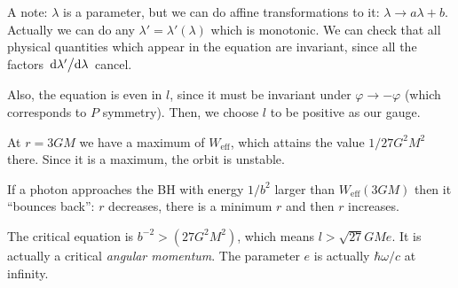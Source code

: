 \documentclass[main.tex]{subfiles}
\begin{document}
A note: \(\lambda \) is a parameter, but we can do affine transformations to it: \(\lambda \rightarrow a \lambda + b\). Actually we can do any \(\lambda' = \lambda' (\lambda )\) which is monotonic. 
We can check that all physical quantities which appear in the equation are invariant, since all the factors \(\dv*{\lambda ' }{\lambda }\) cancel. 

Also, the equation is even in \(l\), since it must be invariant under \(\varphi \rightarrow - \varphi \) (which corresponds to \(P\) symmetry).
Then, we choose \(l\) to be positive as our gauge.

At \(r = 3GM\) we have a maximum of \(W _{\text{eff}}\), which attains the value \(1 / 27 G^2M^2\) there.
Since it is a maximum, the orbit is unstable. 

If a photon approaches the BH with energy \(1/ b^2\) larger than \(W _{\text{eff}}(3GM)\) then it ``bounces back'': \(r\) decreases, there is a minimum \(r\) and then \(r\) increases. 

The critical equation is \(b^{-2} > (27 G^2M^2)\), which means \(l > \sqrt{27} GM e\). It is actually a critical \emph{angular momentum}.
The parameter \(e \) is actually \(\hbar \omega / c\) at infinity. 
\end{document}
